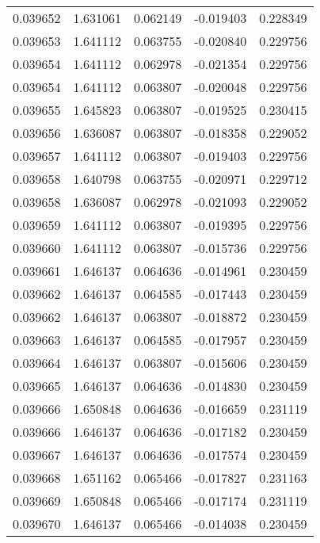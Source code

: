 \begin{tabular}{lrrrr}
0.039652    &  1.631061 &  0.062149 & -0.019403 &             0.228349 \\
0.039653    &  1.641112 &  0.063755 & -0.020840 &             0.229756 \\
0.039654    &  1.641112 &  0.062978 & -0.021354 &             0.229756 \\
0.039654    &  1.641112 &  0.063807 & -0.020048 &             0.229756 \\
0.039655    &  1.645823 &  0.063807 & -0.019525 &             0.230415 \\
0.039656    &  1.636087 &  0.063807 & -0.018358 &             0.229052 \\
0.039657    &  1.641112 &  0.063807 & -0.019403 &             0.229756 \\
0.039658    &  1.640798 &  0.063755 & -0.020971 &             0.229712 \\
0.039658    &  1.636087 &  0.062978 & -0.021093 &             0.229052 \\
0.039659    &  1.641112 &  0.063807 & -0.019395 &             0.229756 \\
0.039660    &  1.641112 &  0.063807 & -0.015736 &             0.229756 \\
0.039661    &  1.646137 &  0.064636 & -0.014961 &             0.230459 \\
0.039662    &  1.646137 &  0.064585 & -0.017443 &             0.230459 \\
0.039662    &  1.646137 &  0.063807 & -0.018872 &             0.230459 \\
0.039663    &  1.646137 &  0.064585 & -0.017957 &             0.230459 \\
0.039664    &  1.646137 &  0.063807 & -0.015606 &             0.230459 \\
0.039665    &  1.646137 &  0.064636 & -0.014830 &             0.230459 \\
0.039666    &  1.650848 &  0.064636 & -0.016659 &             0.231119 \\
0.039666    &  1.646137 &  0.064636 & -0.017182 &             0.230459 \\
0.039667    &  1.646137 &  0.064636 & -0.017574 &             0.230459 \\
0.039668    &  1.651162 &  0.065466 & -0.017827 &             0.231163 \\
0.039669    &  1.650848 &  0.065466 & -0.017174 &             0.231119 \\
0.039670    &  1.646137 &  0.065466 & -0.014038 &             0.230459 \\

\end{tabular}
